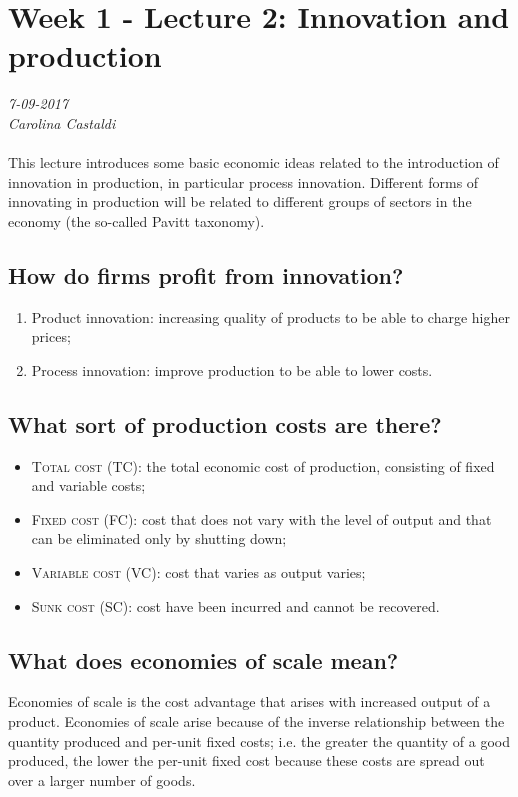 \chapter{Week 1 - Lecture 2: Innovation and production }
\textit{7-09-2017 \\
Carolina Castaldi \\} 
\\
This lecture introduces some basic economic ideas related to the introduction of innovation in production, in particular process innovation. Different forms of innovating in production will be related to different groups of sectors in the economy (the so-called Pavitt taxonomy).
\\
\section{How do firms profit from innovation?}
\begin{enumerate}
\item Product innovation: increasing quality of products to be able to charge higher prices;
\item Process innovation: improve production to be able to lower costs.
\end{enumerate}

\section{What sort of production costs are there?}
\begin{itemize}
\item \textsc{Total cost} (TC): the total economic cost of production, consisting of fixed and variable costs;
\item \textsc{Fixed cost} (FC): cost that does not vary with the level of output and that can be eliminated only by shutting down;
\item \textsc{Variable cost} (VC): cost that varies as output varies;
\item \textsc{Sunk cost} (SC): cost have been incurred and cannot be recovered.
\end{itemize}

\section{What does economies of scale mean?}
Economies of scale is the cost advantage that arises with increased output of a product. Economies of scale arise because of the inverse relationship between the quantity produced and per-unit fixed costs; i.e. the greater the quantity of a good produced, the lower the per-unit fixed cost because these costs are spread out over a larger number of goods.
